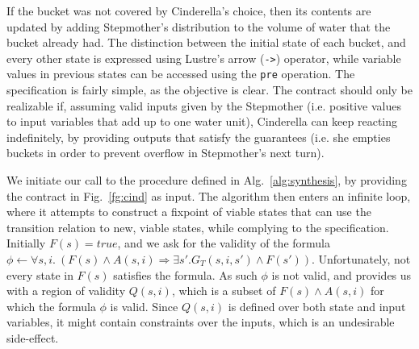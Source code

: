 If the bucket was not covered by Cinderella's choice, then its contents are
updated by adding Stepmother's distribution to the volume of water that the
bucket already had. The distinction between the initial state of each bucket,
and every other state is expressed using Lustre's arrow (\texttt{->})
operator, while variable values in previous states can be accessed using the
\texttt{pre} operation.
The specification is fairly simple, as the objective is clear. The contract
should only be realizable if, assuming valid inputs given by the Stepmother
(i.e. positive values to input variables that add up to one water unit),
Cinderella can keep reacting indefinitely, by providing outputs that satisfy the
guarantees (i.e. she empties buckets in order to prevent overflow in Stepmother's next turn).
\iffalse
\begin{figure}[!t]
\centering
 \begin{Verbatim}[fontsize=\scriptsize]
...
(and ...
 (or (not (<= (+ b2 i2) 2.0)) (<= (+ b2 i2) 2.0) (and (<= (+ b2 i2) 2.0)
     (not (<= (+ b2 i2) 2.0)) 
     (or (and (not (>= (+ b1 i1) 2.0)) 
   	          (<= (- 5.0) (+ (* (- 1.0) i5) (* (- 1.0) b2) (* (- 1.0) i2))))
         (and (not (<= (+ b2 i2) 0.0)) (not (>= (+ b3 i3) 2.0))  (not (>= i4 2.0)) 
              (<= (- 5.0) (+ (* (- 1.0) i5) (* (- 1.0) b2) (* (- 1.0) i2)))))))
 (or (and %init (= i4 0.0)) (not %init))
 (or (and %init (= i5 0.0)) (not %init))
 (<= (+ b3 i3) 2.0)
 (<= i4 2.0)
 (<= i5 2.0)
 ...)
...
 \end{Verbatim}
\caption{Code snippet of the region of validity generated for the Cinderella-Stepmother
example}
\label{fg:snippet}
\end{figure}
\fi
We initiate our call to the procedure defined in Alg.~\ref{alg:synthesis},
by providing the contract in Fig.~\ref{fg:cind} as input. The algorithm
then enters an infinite loop, where it attempts to construct a fixpoint of
viable states that can use the transition relation to new, viable states,
while complying to the specification. Initially $F(s) = true$, and we ask \aeval for the validity of the formula $\phi \gets \forall s,i. \ (F(s) \land A(s,i) \Rightarrow \exists s'.G_{T}(s,i,s') \land F(s'))$. Unfortunately, not every state in $F(s)$
satisfies the formula. As such $\phi$ is not valid, and \aeval provides us with
a region of validity $Q(s,i)$, which is a subset of $F(s) \land A(s,i)$ for
which the formula $\phi$ is valid. Since $Q(s,i)$ is defined over both state and
input variables, it might contain constraints over the inputs, which is an
undesirable side-effect.
